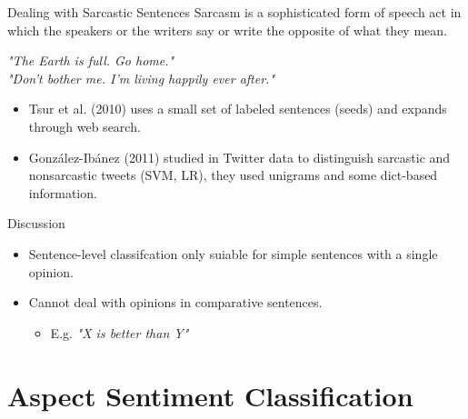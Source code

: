 \documentclass[xcolor=table]{beamer}
\begin{document}
\begin{frame}{Dealing with Sarcastic Sentences}
    Sarcasm is a sophisticated form of speech act in which the speakers or the writers say or write the opposite of what they mean.
    
    \begin{example}
        \textit{"The Earth is full. Go home."} \\
        \textit{"Don't bother me. I'm living happily ever after."}
    \end{example}
    
    \begin{itemize}
        \item Tsur et al. (2010) \cite{davidov2010semi} uses a small set of labeled sentences (seeds) and expands through web search.
        \item González-Ibánez (2011) studied in Twitter data to distinguish sarcastic and nonsarcastic tweets (SVM, LR), they used unigrams and some dict-based information.
    \end{itemize}
    
\end{frame}

\begin{frame}{Discussion}
    \begin{itemize}
        \item Sentence-level classifcation only suiable for simple sentences with a single opinion.
        \item Cannot deal with opinions in comparative sentences.
        \begin{itemize}
            \item E.g. \textit{"X is better than Y"}
        \end{itemize}
    \end{itemize}
\end{frame}

\section{Aspect Sentiment Classification}
\end{document}
